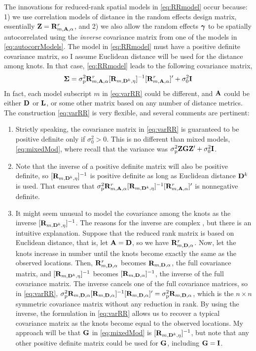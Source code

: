 \documentclass[11pt, titlepage]{article}\usepackage[]{graphicx}\usepackage[]{color}
\begin{document}
\begin{spacing}{1.9}
\begin{flushleft}
The innovations for reduced-rank spatial models in \ref{eq:RRmodel} occur because: 1) we use correlation models of distance in the random effects design matrix, essentially $\mathbf{Z} = \mathbf{R}^r_{m,\mathbf{A},\alpha}$, and 2) we also allow the random effects $\mbox{\boldmath $\gamma$}$ to be spatially autocorrelated using the \emph{inverse} covariance matrix from one of the models in \ref{eq:autocorrModels}.  The model in \ref{eq:RRmodel} must have a positive definite covariance matrix, so I assume Euclidean distance will be used for the distance among knots.  In that case, \ref{eq:RRmodel} leads to the following covariance matrix,
\begin{equation} \label{eq:varRR}
				\mbox{\boldmath $\Sigma$} = \sigma^2_\textrm{p}\mathbf{R}^r_{m,\mathbf{A},\alpha}[\mathbf{R}_{m,\mathbf{D}^k,\eta}]^{-1}[\mathbf{R}^r_{m,\mathbf{A},\alpha}]^{\prime} + \sigma^2_0\mathbf{I}
\end{equation}
In fact, each model subscript $m$ in \ref{eq:varRR} could be different, and $\mathbf{A}$ could be either $\mathbf{D}$ or $\mathbf{L}$, or some other matrix based on any number of distance metrics.  The construction \ref{eq:varRR} is very flexible, and several comments are pertinent:
\begin{enumerate}
		\item Strictly speaking, the covariance matrix in \ref{eq:varRR} is guaranteed to be positive definite only if $\sigma_0^2 > 0$. This is no different than mixed models, \ref{eq:mixedMod}, where recall that the variance was $\sigma^2_\textrm{p}\mathbf{Z}\mathbf{G}\mathbf{Z}^{\prime} + \sigma_0^2\mathbf{I}$.  
		\item Note that the inverse of a positive definite matrix will also be positive definite, so $[\mathbf{R}_{m,\mathbf{D}^k,\eta}]^{-1}$ is positive definite as long as Euclidean distance $\mathbf{D}^k$ is used.  That ensures that $\sigma^2_\textrm{p}\mathbf{R}^r_{m,\mathbf{A},\alpha}[\mathbf{R}_{m,\mathbf{D}^k,\eta}]^{-1}[\mathbf{R}^r_{m,\mathbf{A},\alpha}]^{\prime}$ is nonnegative definite.
		\item It might seem unusual to model the covariance among the knots as the inverse $[\mathbf{R}_{m,\mathbf{D}^k,\eta}]^{-1}$. The reasons for the inverse are complex \citep{Bane:Gelf:Finl:Sang:gaus:2008},  but there is an intuitive explanation.  Suppose that the reduced rank matrix is based on Euclidean distance, that is, let $\mathbf{A} = \mathbf{D}$, so we have $\mathbf{R}^r_{m,\mathbf{D},\alpha}$. Now, let the knots increase in number until the knots become exactly the same as the observed locations. Then, $\mathbf{R}^r_{m,\mathbf{D},\alpha}$ becomes $\mathbf{R}_{m,\mathbf{D},\alpha}$, the full covariance matrix, and $[\mathbf{R}_{m,\mathbf{D}^k,\eta}]^{-1}$ becomes $[\mathbf{R}_{m,\mathbf{D},\alpha}]^{-1}$, the inverse of the full covariance matrix. The inverse cancels one of the full covariance matrices, so in \ref{eq:varRR}, $\sigma^2_\textrm{p}\mathbf{R}_{m,\mathbf{D},\alpha}[\mathbf{R}_{m,\mathbf{D},\alpha}]^{-1}[\mathbf{R}_{m,\mathbf{D},\alpha}]^{\prime} = \sigma^2_\textrm{p}\mathbf{R}_{m,\mathbf{D},\alpha}$, which is the $n \times n$ symmetric covariance matrix without any reduction in rank.  By using the inverse, the formulation in \ref{eq:varRR} allows us to recover a typical covariance matrix as the knots become equal to the observed locations.  My approach will be that $\mathbf{G}$ in \ref{eq:mixedMod} is $[\mathbf{R}_{m,\mathbf{D}^k,\eta}]^{-1}$, but note that any other positive definite matrix could be used for $\mathbf{G}$, including $\mathbf{G} = \mathbf{I}$.

\end{enumerate}
\end{flushleft}
\end{spacing}
\end{document}
